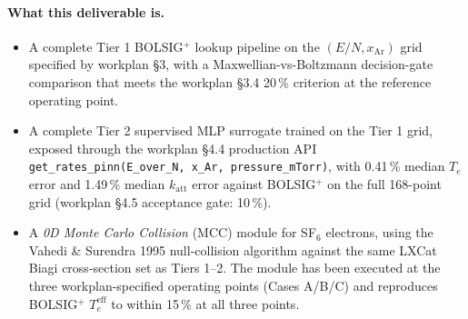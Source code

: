 \documentclass[11pt,a4paper]{article}
\begin{document}
\paragraph{What this deliverable is.}
\begin{itemize}
  \item A complete Tier 1 BOLSIG$^+$ lookup pipeline on the
        $(E/N, x_{\mathrm{Ar}})$ grid specified by workplan §3,
        with a Maxwellian-vs-Boltzmann decision-gate comparison
        that meets the workplan §3.4 20\,\% criterion at the
        reference operating point.
  \item A complete Tier 2 supervised MLP surrogate trained on
        the Tier 1 grid, exposed through the workplan §4.4
        production API
        \texttt{get\_rates\_pinn(E\_over\_N, x\_Ar,
        pressure\_mTorr)}, with 0.41\,\% median $T_e$ error and
        1.49\,\% median $k_{\mathrm{att}}$ error against
        BOLSIG$^+$ on the full 168-point grid (workplan §4.5
        acceptance gate: 10\,\%).
  \item A \emph{0D Monte Carlo Collision} (MCC) module for
        SF$_6$ electrons, using the Vahedi \& Surendra 1995
        null-collision algorithm against the same LXCat Biagi
        cross-section set as Tiers 1--2. The module has been
        executed at the three workplan-specified operating
        points (Cases A/B/C) and reproduces BOLSIG$^+$
        $T_e^{\mathrm{eff}}$ to within 15\,\% at all three
        points.
\end{itemize}
\end{document}
